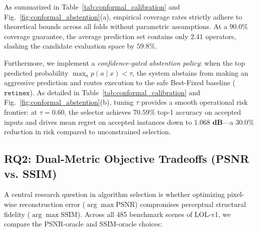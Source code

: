 \documentclass[journal]{IEEEtran}
\begin{document}
As summarized in Table~\ref{tab:conformal_calibration} and Fig.~\ref{fig:conformal_abstention}(a), empirical coverage rates strictly adhere to theoretical bounds across all folds without parametric assumptions. At a $90.0\%$ coverage guarantee, the average prediction set contains only $2.41$ operators, slashing the candidate evaluation space by $59.8\%$.

Furthermore, we implement a \textit{confidence-gated abstention policy}: when the top predicted probability $\max_a p(a \mid x) < \tau$, the system abstains from making an aggressive prediction and routes execution to the safe Best-Fixed baseline ($\texttt{retinex}$). As detailed in Table~\ref{tab:conformal_calibration} and Fig.~\ref{fig:conformal_abstention}(b), tuning $\tau$ provides a smooth operational risk frontier: at $\tau = 0.60$, the selector achieves $\mathbf{70.59\%}$ top-1 accuracy on accepted inputs and drives mean regret on accepted instances down to $\mathbf{1.068\text{ dB}}$—a $30.0\%$ reduction in risk compared to unconstrained selection.

\subsection{RQ2: Dual-Metric Objective Tradeoffs (PSNR vs. SSIM)}
A central research question in algorithm selection is whether optimizing pixel-wise reconstruction error ($\arg\max \text{PSNR}$) compromises perceptual structural fidelity ($\arg\max \text{SSIM}$). Across all 485 benchmark scenes of LOL-v1, we compare the PSNR-oracle and SSIM-oracle choices:

\begin{table}[!t]
\centering
\caption{RQ2 Dual-Metric Benchmark: PSNR vs. SSIM Alignment and Regret}
\label{tab:rq2_dual_metric}
\end{table}
\end{document}
